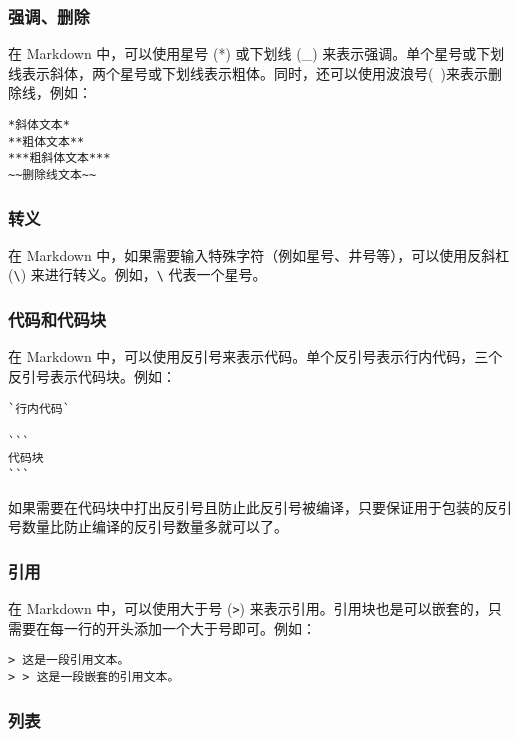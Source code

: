 \documentclass[../main.tex]{subfiles}
\begin{document}
\subsubsection{强调、删除}

在 Markdown 中，可以使用星号 (*) 或下划线 (\_) 来表示强调。单个星号或下划线表示斜体，两个星号或下划线表示粗体。同时，还可以使用波浪号(~)来表示删除线，例如：

\begin{lstlisting}
*斜体文本*
**粗体文本**
***粗斜体文本***
~~删除线文本~~
\end{lstlisting}

\subsubsection{转义}

在 Markdown 中，如果需要输入特殊字符（例如星号、井号等），可以使用反斜杠 (\texttt{\textbackslash}) 来进行转义。例如，\texttt{\textbackslash*} 代表一个星号。

\subsubsection{代码和代码块}

在 Markdown 中，可以使用反引号来表示代码。单个反引号表示行内代码，三个反引号表示代码块。例如：

\begin{lstlisting}
`行内代码`

```
代码块
```
\end{lstlisting}

如果需要在代码块中打出反引号且防止此反引号被编译，只要保证用于包装的反引号数量比防止编译的反引号数量多就可以了。

\subsubsection{引用}

在 Markdown 中，可以使用大于号 (\texttt{>}) 来表示引用。引用块也是可以嵌套的，只需要在每一行的开头添加一个大于号即可。例如：

\begin{lstlisting}
> 这是一段引用文本。
> > 这是一段嵌套的引用文本。
\end{lstlisting}

\subsubsection{列表}
\end{document}

